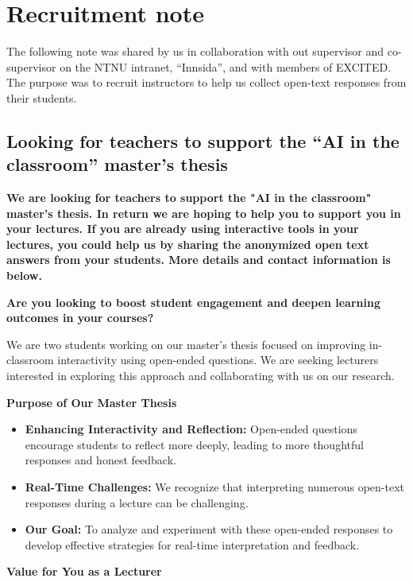 \chapter{Recruitment note}\label{app:recruitment-note}

The following note was shared by us in collaboration with out supervisor and co-supervisor on the NTNU intranet, ``Innsida'', and with members of EXCITED. The purpose was to recruit instructors to help us collect open-text responses from their students.

\setlength\parskip{1em plus 0.1em minus 0.2em}
\setlength\parindent{0pt}

\section*{Looking for teachers to support the ``AI in the classroom'' master's thesis}

\textbf{We are looking for teachers to support the "AI in the classroom" master's thesis. In return we are hoping to help you to support you in your lectures. If you are already using interactive tools in your lectures, you could help us by sharing the anonymized open text answers from your students. More details and contact information is below.}

\textbf{Are you looking to boost student engagement and deepen learning outcomes in your courses?}

We are two students working on our master's thesis focused on improving in-classroom interactivity using open-ended questions. We are seeking lecturers interested in exploring this approach and collaborating with us on our research.

\textbf{Purpose of Our Master Thesis}

\begin{itemize}
    \item \textbf{Enhancing Interactivity and Reflection:} Open-ended questions encourage students to reflect more deeply, leading to more thoughtful responses and honest feedback.
    \item \textbf{Real-Time Challenges:} We recognize that interpreting numerous open-text responses during a lecture can be challenging.
    \item \textbf{Our Goal:} To analyze and experiment with these open-ended responses to develop effective strategies for real-time interpretation and feedback.
\end{itemize}

\textbf{Value for You as a Lecturer}

